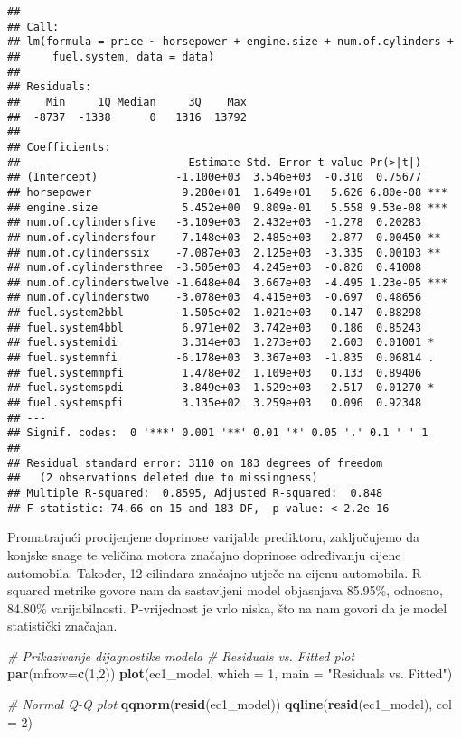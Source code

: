 \documentclass[
]{article}
\newenvironment{Shaded}{\begin{snugshade}}{\end{snugshade}}
\newcommand{\AttributeTok}[1]{\textcolor[rgb]{0.13,0.29,0.53}{#1}}
\newcommand{\CommentTok}[1]{\textcolor[rgb]{0.56,0.35,0.01}{\textit{#1}}}
\newcommand{\DecValTok}[1]{\textcolor[rgb]{0.00,0.00,0.81}{#1}}
\newcommand{\FunctionTok}[1]{\textcolor[rgb]{0.13,0.29,0.53}{\textbf{#1}}}
\newcommand{\NormalTok}[1]{#1}
\newcommand{\StringTok}[1]{\textcolor[rgb]{0.31,0.60,0.02}{#1}}
\begin{document}
\begin{verbatim}
## 
## Call:
## lm(formula = price ~ horsepower + engine.size + num.of.cylinders + 
##     fuel.system, data = data)
## 
## Residuals:
##    Min     1Q Median     3Q    Max 
##  -8737  -1338      0   1316  13792 
## 
## Coefficients:
##                          Estimate Std. Error t value Pr(>|t|)    
## (Intercept)            -1.100e+03  3.546e+03  -0.310  0.75677    
## horsepower              9.280e+01  1.649e+01   5.626 6.80e-08 ***
## engine.size             5.452e+00  9.809e-01   5.558 9.53e-08 ***
## num.of.cylindersfive   -3.109e+03  2.432e+03  -1.278  0.20283    
## num.of.cylindersfour   -7.148e+03  2.485e+03  -2.877  0.00450 ** 
## num.of.cylinderssix    -7.087e+03  2.125e+03  -3.335  0.00103 ** 
## num.of.cylindersthree  -3.505e+03  4.245e+03  -0.826  0.41008    
## num.of.cylinderstwelve -1.648e+04  3.667e+03  -4.495 1.23e-05 ***
## num.of.cylinderstwo    -3.078e+03  4.415e+03  -0.697  0.48656    
## fuel.system2bbl        -1.505e+02  1.021e+03  -0.147  0.88298    
## fuel.system4bbl         6.971e+02  3.742e+03   0.186  0.85243    
## fuel.systemidi          3.314e+03  1.273e+03   2.603  0.01001 *  
## fuel.systemmfi         -6.178e+03  3.367e+03  -1.835  0.06814 .  
## fuel.systemmpfi         1.478e+02  1.109e+03   0.133  0.89406    
## fuel.systemspdi        -3.849e+03  1.529e+03  -2.517  0.01270 *  
## fuel.systemspfi         3.135e+02  3.259e+03   0.096  0.92348    
## ---
## Signif. codes:  0 '***' 0.001 '**' 0.01 '*' 0.05 '.' 0.1 ' ' 1
## 
## Residual standard error: 3110 on 183 degrees of freedom
##   (2 observations deleted due to missingness)
## Multiple R-squared:  0.8595, Adjusted R-squared:  0.848 
## F-statistic: 74.66 on 15 and 183 DF,  p-value: < 2.2e-16
\end{verbatim}

Promatrajući procijenjene doprinose varijable prediktoru, zaključujemo
da konjske snage te veličina motora značajno doprinose određivanju
cijene automobila. Također, 12 cilindara značajno utječe na cijenu
automobila. R-squared metrike govore nam da sastavljeni model objasnjava
85.95\%, odnosno, 84.80\% varijabilnosti. P-vrijednost je vrlo niska,
što na nam govori da je model statistički značajan.

\begin{Shaded}
\begin{Highlighting}[]
\CommentTok{\# Prikazivanje dijagnostike modela}
\CommentTok{\# Residuals vs. Fitted plot}
\FunctionTok{par}\NormalTok{(}\AttributeTok{mfrow=}\FunctionTok{c}\NormalTok{(}\DecValTok{1}\NormalTok{,}\DecValTok{2}\NormalTok{))}
\FunctionTok{plot}\NormalTok{(ec1\_model, }\AttributeTok{which =} \DecValTok{1}\NormalTok{, }\AttributeTok{main =} \StringTok{"Residuals vs. Fitted"}\NormalTok{)}

\CommentTok{\# Normal Q{-}Q plot}
\FunctionTok{qqnorm}\NormalTok{(}\FunctionTok{resid}\NormalTok{(ec1\_model))}
\FunctionTok{qqline}\NormalTok{(}\FunctionTok{resid}\NormalTok{(ec1\_model), }\AttributeTok{col =} \DecValTok{2}\NormalTok{)}
\end{Highlighting}
\end{Shaded}
\end{document}
